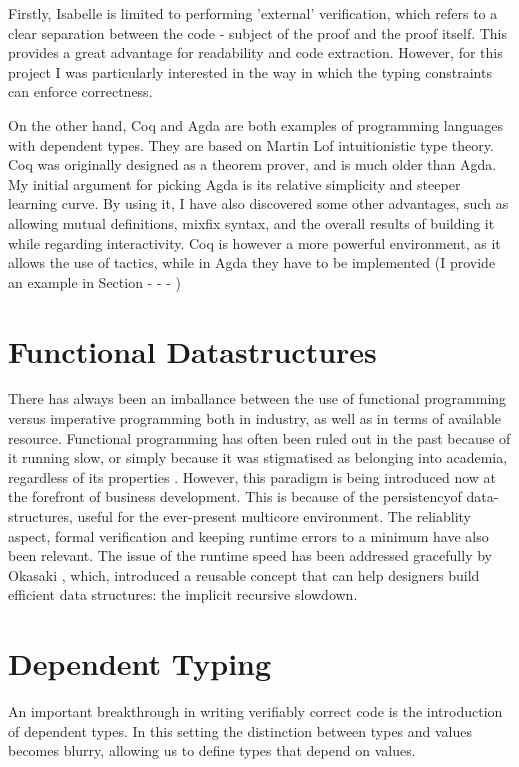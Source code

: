 \documentclass[12pt,twoside,notitlepage]{report}
\begin{document}
Firstly, Isabelle is limited to performing 'external' verification, which refers to a clear separation between the code - subject of the proof and the proof itself. This provides a great advantage for readability and code extraction. However, for this project I was particularly interested in the way in which the typing constraints can enforce correctness.

On the other hand, Coq and Agda are both examples of programming languages with dependent types. They are based on Martin Lof intuitionistic type theory. Coq was originally designed as a theorem prover, and is much older than Agda. My initial argument for picking Agda is its relative simplicity and steeper learning curve. By using it, I have also discovered some other advantages, such as allowing mutual definitions, mixfix syntax, and the overall results of building it while regarding interactivity. Coq is however a more powerful environment, as it allows the use of tactics, while in Agda they have to be implemented (I provide an example in Section - - - )



\section{Functional Datastructures}

There has always been an imballance between the use of functional programming versus imperative programming both in
industry, as well as in terms of available resource. Functional programming has often been ruled out in the
past because of it running slow, or simply because it was stigmatised as belonging into academia, regardless of its
properties \cite{landin}. However, this paradigm
is being introduced now at the forefront of business development. This is because of the persistency\footnotemark[0] of data-structures,
useful for the ever-present multicore environment. The reliablity aspect, formal verification and
keeping runtime errors to a minimum have also been relevant.
The issue of the runtime speed has been addressed gracefully by Okasaki \cite{oka}, which, introduced a reusable concept
that can help designers build efficient data structures: the implicit recursive slowdown.

\section{Dependent Typing}

An important breakthrough in writing verifiably correct code is the introduction of dependent types.\cite{achipala}
In this setting the distinction between types and values becomes blurry, allowing us to define types that depend on values.
\end{document}
